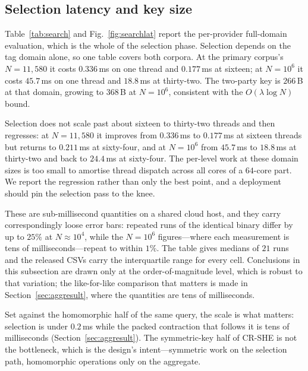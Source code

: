 \documentclass[journal]{IEEEtran}
\begin{document}
\subsection{Selection latency and key size}
Table~\ref{tab:search} and Fig.~\ref{fig:searchlat} report the per-provider
full-domain evaluation, which is the whole of the selection phase. Selection
depends on the tag domain alone, so one table covers both corpora. At the
primary corpus's $N=11{,}580$ it costs $0.336$\,ms on one thread and
$0.177$\,ms at sixteen; at $N=10^6$ it costs $45.7$\,ms on one thread and
$18.8$\,ms at thirty-two. The two-party key is $266$\,B at that domain,
growing to $368$\,B at $N=10^6$,
consistent with the $O(\lambda\log N)$ bound.

Selection does not scale past about sixteen to thirty-two threads and then
regresses: at $N=11{,}580$ it improves from $0.336$\,ms to $0.177$\,ms at
sixteen threads but returns to $0.211$\,ms at sixty-four, and at $N=10^6$ from
$45.7$\,ms to $18.8$\,ms at thirty-two and back to $24.4$\,ms at sixty-four. The
per-level work at these domain sizes is too small to amortise thread dispatch
across all cores of a $64$-core part. We report the regression rather than only
the best point, and a deployment should pin the selection pass to the knee.

These are sub-millisecond quantities on a shared cloud host, and they carry
correspondingly loose error bars: repeated runs of the identical binary differ
by up to $25\%$ at $N\approx10^4$, while the $N=10^6$ figures---where each
measurement is tens of milliseconds---repeat to within $1\%$. The table gives
medians of $21$ runs and the released CSVs carry the interquartile range for
every cell. Conclusions in this subsection are drawn only at the
order-of-magnitude level, which is robust to that variation; the like-for-like comparison
that matters is made in Section~\ref{sec:aggresult}, where the quantities are
tens of milliseconds.

Set against the homomorphic half of the same query, the scale is what matters:
selection is under $0.2$\,ms while the packed contraction that follows it is
tens of milliseconds (Section~\ref{sec:aggresult}). The symmetric-key half of
CR-SHE is not the bottleneck, which is the design's intent---symmetric work on
the selection path, homomorphic operations only on the aggregate.
\end{document}
